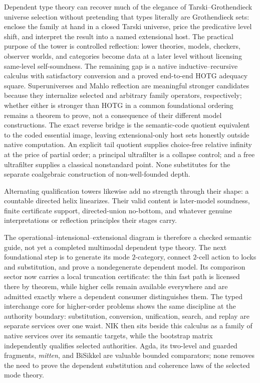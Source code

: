 \documentclass[11pt]{article}
\theoremstyle{definition}
\theoremstyle{remark}
\begin{document}
Dependent type theory can recover much of the elegance of
Tarski--Grothendieck universe selection without pretending that types literally
are Grothendieck sets: enclose the family at hand in a closed Tarski universe,
price the predicative level shift, and interpret the result into a named
extensional host.  The practical purpose of the tower is controlled reflection:
lower theories, models, checkers, observer worlds, and categories become data at
a later level without licensing same-level self-soundness.  The remaining gap is
a native inductive--recursive calculus with satisfactory conversion and a proved
end-to-end HOTG adequacy square.  Superuniverses and Mahlo reflection are
meaningful stronger candidates because they internalize selected and arbitrary
family operators, respectively; whether either is stronger than HOTG in a common
foundational ordering remains a theorem to prove, not a consequence of their
different model constructions.  The exact reverse bridge is the semantic-code
quotient equivalent to the coded essential image, leaving extensional-only
host sets honestly outside native computation.  An explicit tail quotient
supplies choice-free relative infinity at the price of partial order; a
principal ultrafilter is a collapse
control; and a free ultrafilter supplies a classical nonstandard point.  None
substitutes for the separate coalgebraic construction of non-well-founded depth.

Alternating qualification towers likewise add no strength through their shape:
a countable directed helix linearizes.  Their valid content is later-model
soundness, finite certificate support, directed-union no-bottom, and whatever
genuine interpretations or reflection principles their stages carry.

The operational--intensional--extensional diagram is therefore a checked
semantic guide, not yet a completed multimodal dependent type theory.  The next
foundational step is to generate its mode $2$-category, connect $2$-cell action
to locks and substitution, and prove a nondegenerate dependent model.  Its
comparison sector now carries a local truncation certificate: the thin fast
path is licensed there by theorem, while higher cells remain available
everywhere and are admitted exactly where a dependent consumer distinguishes
them.  The typed interchange core for higher-order problems shows the same
discipline at the authority boundary: substitution, conversion, unification,
search, and replay are separate services over one waist.  NIK then
sits beside this calculus as a family of native services over its semantic
targets, while the
bootstrap matrix independently qualifies selected authorities.  Agda, its
two-level and guarded fragments, \emph{mitten}, and BiSikkel are valuable bounded
comparators; none removes the need to prove the dependent substitution and
coherence laws of the selected mode theory.
\end{document}
